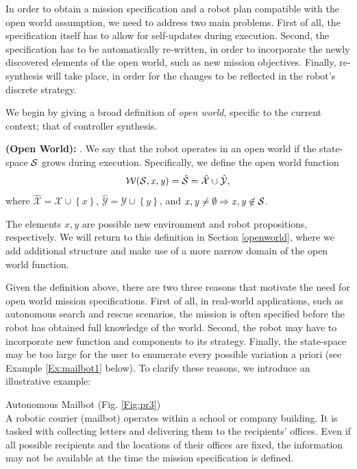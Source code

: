 In order to obtain a mission specification and a robot plan compatible with the open world assumption, we need to address two main problems. First of all, the specification itself has to allow for self-updates during execution. Second, the specification has to be automatically re-written, in order to incorporate the newly discovered elements of the open world, such as new mission objectives. Finally, re-synthesis will take place, in order for the changes to be reflected in the robot's discrete strategy.

We begin by giving a broad definition of \emph{open world}, specific to the current context; that of controller synthesis.

\begin{myDefinition}\label{Def:openworld}
	\textbf{(Open World):} . We say that the robot operates in an open world if the state-space $\mathcal{S}$ grows during execution. Specifically, we define the open world function $$\mathcal{W}(\mathcal{S}, \mathit{x}, \mathit{y}) = \hat{\mathcal{S}} = \hat{\mathcal{X}} \cup \hat{\mathcal{Y}},$$
	where $\hat{\mathcal{X}} = \mathcal{X} \cup \left\{ \mathit{x} \right\}$, $\hat{\mathcal{Y}} = \mathcal{Y} \cup \left\{ \mathit{y} \right\}$, and $\mathit{x}, \mathit{y} \neq \emptyset \Rightarrow \mathit{x}, \mathit{y} \not \in \mathcal{S} $.
	\end{myDefinition} 
The elements $\mathit{x}, \mathit{y}$ are possible new environment and robot propositions, respectively. We will return to this definition in Section \ref{openworld}, where we add additional structure and make use of a more narrow domain of the open world function.

Given the definition above, there are two three reasons that motivate the need for open world mission specifications. First of all, in real-world applications, such as autonomous search and rescue scenarios, the mission is often specified before the robot has obtained full knowledge of the world. Second, the robot may have to incorporate new function and components to its strategy. Finally, the state-space may be too large for the user to enumerate every possible variation a priori (see Example \ref{Ex:mailbot1} below).  To clarify these reasons, we introduce an illustrative example:

\begin{myExample}\label{Ex:mailbot1} Autonomous Mailbot (Fig. \ref{Fig:pr3})\\
	A robotic courier (mailbot) operates within a school or company building. It is tasked with collecting letters and delivering them to the recipients' offices. Even if all possible recipients and the locations of their offices are fixed, the information may not be available at the time the mission specification is defined. 
\end{myExample}

